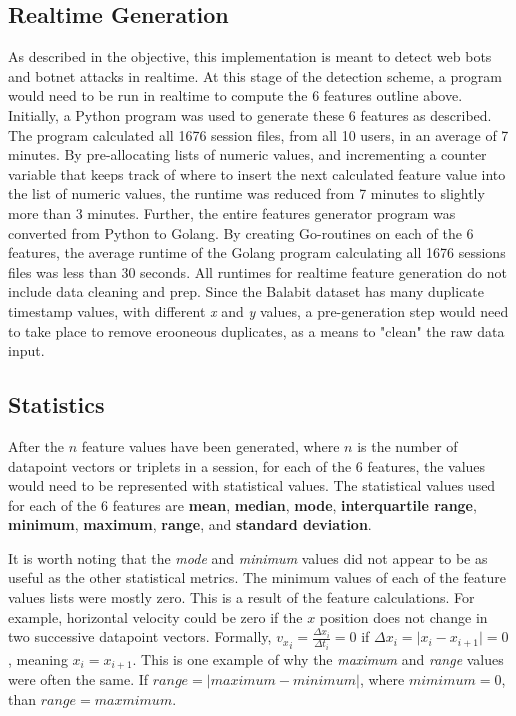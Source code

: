 \subsection{Realtime Generation}\label{subsec:realtime-generation}
As described in the objective, this implementation is meant to detect web bots and botnet attacks in realtime.
At this stage of the detection scheme, a program would need to be run in realtime to compute the 6 features outline above.
Initially, a Python program was used to generate these 6 features as described.
The program calculated all 1676 session files, from all 10 users, in an average of 7 minutes.
By pre-allocating lists of numeric values, and incrementing a counter variable that keeps track of where to insert the next calculated feature value into the list of numeric values, the runtime was reduced from 7 minutes to slightly more than 3 minutes.
Further, the entire features generator program was converted from Python to Golang.
By creating Go-routines on each of the 6 features, the average runtime of the Golang program calculating all 1676 sessions files was less than 30 seconds.
All runtimes for realtime feature generation do not include data cleaning and prep.
Since the Balabit dataset has many duplicate timestamp values, with different \textit{x} and \textit{y} values, a pre-generation step would need to take place to remove erooneous duplicates, as a means to "clean" the raw data input.

\subsection{Statistics}\label{subsec:statistics}
After the $n$ feature values have been generated, where $n$ is the number of datapoint vectors or triplets in a session, for each of the 6 features, the values would need to be represented with statistical values.
The statistical values used for each of the 6 features are \textbf{mean}, \textbf{median}, \textbf{mode}, \textbf{interquartile range}, \textbf{minimum}, \textbf{maximum}, \textbf{range}, and \textbf{standard deviation}.

It is worth noting that the \textit{mode} and \textit{minimum} values did not appear to be as useful as the other statistical metrics.
The minimum values of each of the feature values lists were mostly zero.
This is a result of the feature calculations.
For example, horizontal velocity could be zero if the $x$ position does not change in two successive datapoint vectors.
Formally, ${v_x}_i = \frac{\Delta x_i}{\Delta t_i} = 0$ if $\Delta x_i = \lvert x_i - x_{i+1} \rvert = 0$, meaning $x_i = x_{i+1}$.
This is one example of why the \textit{maximum} and \textit{range} values were often the same.
If $range = \vert maximum - minimum \rvert$, where $mimimum = 0$, than $range = maxmimum$.

